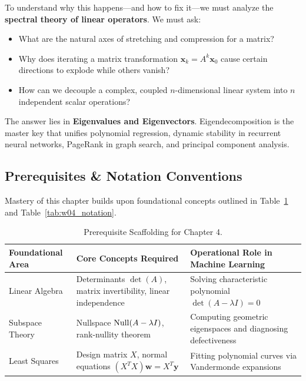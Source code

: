 To understand why this happens—and how to fix it—we must analyze the \textbf{spectral theory of linear operators}. We must ask:
\begin{itemize}
    \item What are the natural axes of stretching and compression for a matrix?
    \item Why does iterating a matrix transformation $\mathbf{x}_{k} = A^k \mathbf{x}_0$ cause certain directions to explode while others vanish?
    \item How can we decouple a complex, coupled $n$-dimensional linear system into $n$ independent scalar operations?
\end{itemize}
The answer lies in \textbf{Eigenvalues and Eigenvectors}. Eigendecomposition is the master key that unifies polynomial regression, dynamic stability in recurrent neural networks, PageRank in graph search, and principal component analysis.

\subsection{Prerequisites \& Notation Conventions}
Mastery of this chapter builds upon foundational concepts outlined in Table~\ref{tab:w04_prereqs} and Table~\ref{tab:w04_notation}.

\begin{table}[htbp]
\centering
\small
\begin{tabularx}{\textwidth}{lXX}
\toprule
\textbf{Foundational Area} & \textbf{Core Concepts Required} & \textbf{Operational Role in Machine Learning} \\
\midrule
Linear Algebra & Determinants $\det(A)$, matrix invertibility, linear independence & Solving characteristic polynomial $\det(A - \lambda I) = 0$ \\
\addlinespace
Subspace Theory & Nullspace $\operatorname{Null}(A - \lambda I)$, rank-nullity theorem & Computing geometric eigenspaces and diagnosing defectiveness \\
\addlinespace
Least Squares & Design matrix $X$, normal equations $(X^T X)\mathbf{w} = X^T \mathbf{y}$ & Fitting polynomial curves via Vandermonde expansions \\
\bottomrule
\end{tabularx}
\caption{Prerequisite Scaffolding for Chapter 4.}
\label{tab:w04_prereqs}
\end{table}

